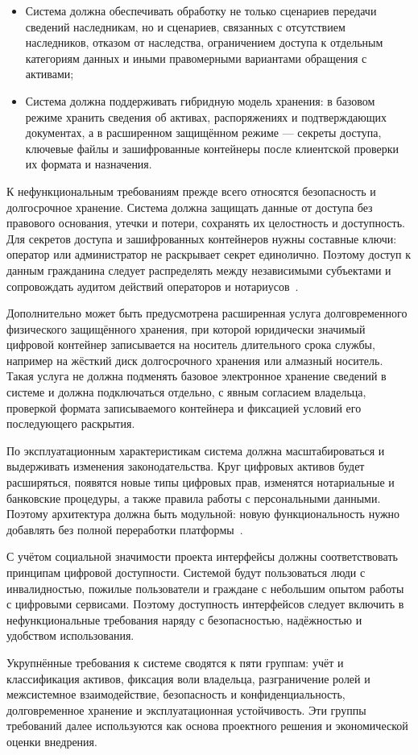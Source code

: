 \begin{itemize}
  \item Система должна обеспечивать обработку не только сценариев передачи сведений наследникам, но и сценариев, связанных с отсутствием наследников, отказом от наследства, ограничением доступа к отдельным категориям данных и иными правомерными вариантами обращения с активами;
  \item Система должна поддерживать гибридную модель хранения: в базовом режиме хранить сведения об активах, распоряжениях и подтверждающих документах, а в расширенном защищённом режиме --- секреты доступа, ключевые файлы и зашифрованные контейнеры после клиентской проверки их формата и назначения.
\end{itemize}

К нефункциональным требованиям прежде всего относятся безопасность и долгосрочное хранение. Система должна защищать данные от доступа без правового основания, утечки и потери, сохранять их целостность и доступность. Для секретов доступа и зашифрованных контейнеров нужны составные ключи: оператор или администратор не раскрывает секрет единолично. Поэтому доступ к данным гражданина следует распределять между независимыми субъектами и сопровождать аудитом действий операторов и нотариусов~\cite{nist80053r5_2020, iso27001_2022}.

Дополнительно может быть предусмотрена расширенная услуга долговременного физического защищённого хранения, при которой юридически значимый цифровой контейнер записывается на носитель длительного срока службы, например на жёсткий диск долгосрочного хранения или алмазный носитель. Такая услуга не должна подменять базовое электронное хранение сведений в системе и должна подключаться отдельно, с явным согласием владельца, проверкой формата записываемого контейнера и фиксацией условий его последующего раскрытия.

По эксплуатационным характеристикам система должна масштабироваться и выдерживать изменения законодательства. Круг цифровых активов будет расширяться, появятся новые типы цифровых прав, изменятся нотариальные и банковские процедуры, а также правила работы с персональными данными. Поэтому архитектура должна быть модульной: новую функциональность нужно добавлять без полной переработки платформы~\cite{Haritonova2024HSE, federalLaw259FZ_2020}.

С учётом социальной значимости проекта интерфейсы должны соответствовать принципам цифровой доступности. Системой будут пользоваться люди с инвалидностью, пожилые пользователи и граждане с небольшим опытом работы с цифровыми сервисами. Поэтому доступность интерфейсов следует включить в нефункциональные требования наряду с безопасностью, надёжностью и удобством использования.

Укрупнённые требования к системе сводятся к пяти группам: учёт и классификация активов, фиксация воли владельца, разграничение ролей и межсистемное взаимодействие, безопасность и конфиденциальность, долговременное хранение и эксплуатационная устойчивость. Эти группы требований далее используются как основа проектного решения и экономической оценки внедрения.
